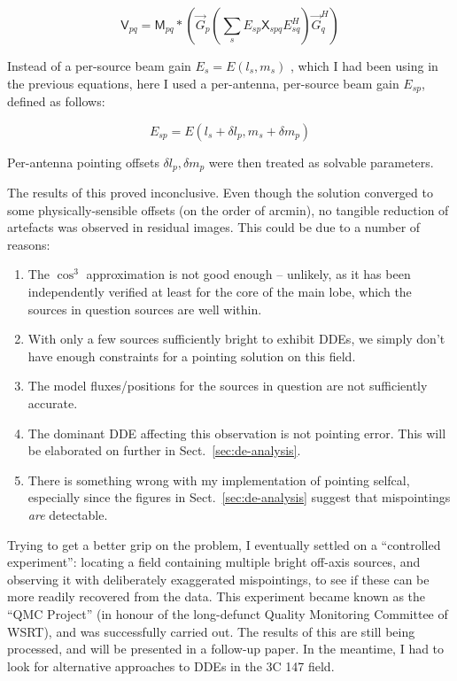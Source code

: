 \documentclass{aa}
\newcommand{\herm}{H}
\newcommand{\jones}[2]{\vec {#1}_{#2}}
\newcommand{\jonesT}[2]{\vec {#1}^{\herm}_{#2}}
\newcommand{\coh}[2]{\mathsf{{#1}}_{{#2}}}
\begin{document}
\begin{equation}\label{eq:3C 147:pointing}
\coh{V}{pq} = \coh{M}{pq} \ast \left ( \jones{G}{p} \left( \sum_s E_{sp} \coh{X}{spq} E^{\herm}_{sq} \right) \jonesT{G}{q} \right )
\end{equation}

Instead of a per-source beam gain $E_s=E(l_s,m_s)$ \citep[where $E(l,m)$ is the $\cos^3$ approximation given by Paper II,][Sect.~2.1.1]{RRIME2}, which I had been using in the previous equations, here I used a per-antenna, per-source beam gain $E_{sp}$, defined as follows:

\begin{equation}\label{eq:3C 147:offset-beam}
E_{sp} = E(l_s+\delta l_p,m_s+\delta m_p)
\end{equation}

Per-antenna pointing offsets $\delta l_p,\delta m_p$ were then treated as solvable parameters. 

The results of this proved inconclusive. Even though the solution converged to some physically-sensible offsets (on the order of arcmin), no tangible reduction of artefacts was observed in residual images. This could be due to a number of reasons:

\begin{enumerate}
\item The $\cos^3$ approximation is not good enough -- unlikely, as it has been independently verified at least for the core of the main lobe, which the sources in question sources are well within.
\item With only a few sources sufficiently bright to exhibit DDEs, we simply don't have enough constraints for a pointing solution on this field.
\item The model fluxes/positions for the sources in question are not sufficiently accurate.
\item The dominant DDE affecting this observation is not pointing error. This will be elaborated on further in Sect.~\ref{sec:de-analysis}. 
\item There is something wrong with my implementation of pointing selfcal, especially since the figures in Sect.~\ref{sec:de-analysis} suggest that mispointings \emph{are} detectable.
\end{enumerate}

Trying to get a better grip on the problem, I eventually settled on a ``controlled experiment'':
locating a field containing multiple bright off-axis sources, and observing it with deliberately exaggerated mispointings, to see if these can be more readily recovered from the data. This experiment became known as the ``QMC Project'' (in honour of the long-defunct Quality Monitoring Committee of WSRT), and was successfully carried out. The results of this are still being processed, and will be presented in a follow-up paper. 
In the meantime, I had to look for alternative approaches to DDEs in the 3C 147 field.
\end{document}
